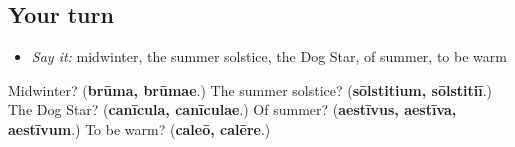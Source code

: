 \subsection*{Your turn}
\begin{itemize}
\raggedright
  \item \emph{Say it:} midwinter, the summer solstice, the Dog Star, of summer, to be warm
\end{itemize}

\begin{tcolorbox}[breakable,colback=teal!4,colframe=teal!35!black,title={Before you move on}]
Midwinter? (\textbf{brūma, brūmae}.) The summer solstice? (\textbf{sōlstitium, sōlstitiī}.) The Dog Star? (\textbf{canīcula, canīculae}.) Of summer? (\textbf{aestīvus, aestīva, aestīvum}.) To be warm? (\textbf{caleō, calēre}.)
\end{tcolorbox}
